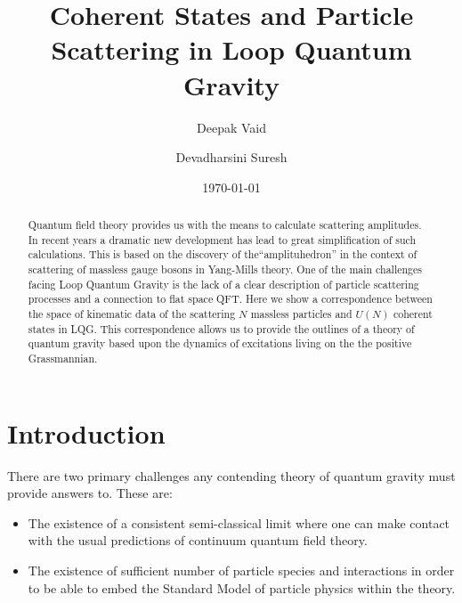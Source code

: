 \documentclass[twocolumn,final,aps,nofootinbib,nobibnotes]{revtex4-2}
\begin{document}

\title{Coherent States and Particle Scattering in Loop Quantum Gravity}

\author{Deepak Vaid}
\author{Devadharsini Suresh}

\date{\today}

\begin{abstract}
Quantum field theory provides us with the means to calculate scattering amplitudes. In recent years a dramatic new development has lead to great simplification of such calculations. This is based on the discovery of the``amplituhedron'' in the context of scattering of massless gauge bosons in Yang-Mills theory. One of the main challenges facing Loop Quantum Gravity is the lack of a clear description of particle scattering processes and a connection to flat space QFT. Here we show a correspondence between the space of kinematic data of the scattering $ N $ massless particles and $ U(N) $ coherent states in LQG. This correspondence allows us to provide the outlines of a theory of quantum gravity based upon the dynamics of excitations living on the the positive Grassmannian.
\end{abstract}

\maketitle

\tableofcontents

\listoftodos

\section{Introduction}

There are two primary challenges any contending theory of quantum gravity must provide answers to. These are:

\begin{itemize}
	\item[\textbf{A.}] The existence of a consistent semi-classical limit where one can make contact with the usual predictions of continuum quantum field theory.
	\item[\textbf{B.}] The existence of sufficient number of particle species and interactions in order to be able to embed the Standard Model of particle physics within the theory.
\end{itemize}
\end{document}

